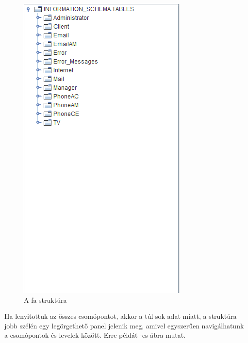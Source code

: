 \begin{figure} [H]
	\centering
	\includegraphics[height=.25\textheight]{images/tree.png}
	\caption{A fa struktúra}
	\label{fig:tree}
\end{figure}

Ha lenyitottuk az összes csomópontot, akkor a túl sok adat miatt, a struktúra jobb szélén egy legörgethető panel jelenik meg, amivel egyszerűen navigálhatunk a csomópontok és levelek között. Erre példát -es ábra mutat.

